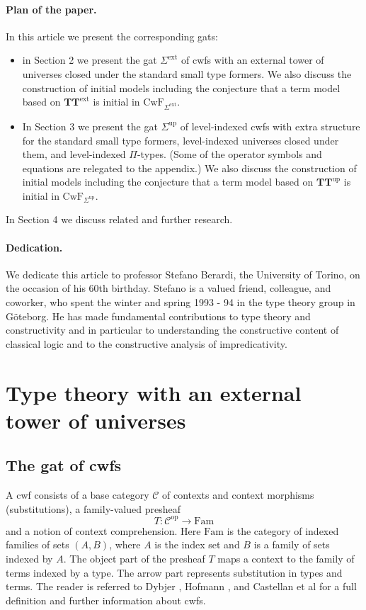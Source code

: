 \documentclass[11pt,a4paper]{article}
\theoremstyle{plain}
\theoremstyle{definition}
\newcommand{\op}{\mathrm{op}}
\def\CwF{\mathrm{CwF}}
\def\Fam{\mathrm{Fam}}
\def\C{\mathcal{C}}
\def\Sigmaext{{\Sigma^\mathrm{ext}}}
\def\Sigmaint{{\Sigma^\mathrm{up}}}
\def\TText{{\mathbf{TT}^\mathrm{ext}}}
\def\TTint{{\mathbf{TT}^\mathrm{up}}}
\begin{document}
\paragraph{Plan of the paper.} 
In this article we present the corresponding gats:
\begin{itemize}
\item in Section 2 we present the gat $\Sigmaext$ of cwfs with an external tower of universes closed under the standard small type formers. We also discuss the construction of initial models including the conjecture that a term model based on $\TText$ is initial in $\CwF_\Sigmaext$.
\item In Section 3 we present the gat $\Sigmaint$ of level-indexed cwfs with extra structure for the standard small type formers, level-indexed universes closed under them, and level-indexed $\Pi$-types. (Some of the operator symbols and equations are relegated to the appendix.) We also discuss the construction of initial models including the conjecture that a term model based on $\TTint$ is initial in $\CwF_\Sigmaint$.
\end{itemize}
In Section 4 we discuss related and further research. 

\paragraph{Dedication.} We dedicate this article to professor Stefano Berardi, the University of Torino, on the occasion of his 60th birthday. Stefano is a valued friend, colleague, and coworker, who spent the winter and spring 1993 - 94 in the type theory group in Göteborg. He has made fundamental contributions to type theory and constructivity and in particular to understanding the constructive content of classical logic and to the constructive analysis of impredicativity.

\section{Type theory with an external tower of universes}

\subsection{The gat of cwfs} A cwf consists of a base category $\C$ of contexts and context morphisms (substitutions), a family-valued presheaf
$$
T : \C^\op \to \Fam
$$
and a notion of context comprehension. Here $\Fam$ is the category of indexed families of sets $(A,B)$, where $A$ is the index set and $B$ is a family of sets indexed by $A$. The object part of the presheaf $T$ maps a context to the family of terms indexed by a type. The arrow part represents substitution in types and terms. The reader is referred to Dybjer \cite{dybjer:torino}, Hofmann \cite{hofmann:cambridge}, and Castellan et al \cite{castellan:lambek} for a full definition and further information about cwfs.
\end{document}
